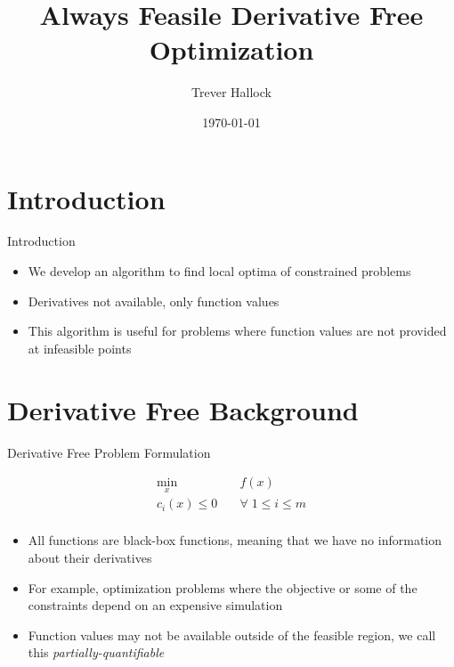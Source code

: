 \documentclass{beamer}
\begin{document}
\title{Always Feasile Derivative Free Optimization}   
\author{Trever Hallock} 
\date{\today} 

\frame{\titlepage} 

\section{Introduction}

\begin{frame}{Introduction}
    \begin{itemize}
        \item We develop an algorithm to find local optima of constrained problems
        \item Derivatives not available, only function values
        \item This algorithm is useful for problems where function values are not provided at infeasible points
    \end{itemize}
\end{frame}

\section{Derivative Free Background}

\begin{frame}{Derivative Free Problem Formulation}
\begin{center}
\label{Problem}
\begin{align*}
\min_x & \quad f(x) \\
  c_i(x) \le 0   & \quad \forall \; 1 \le i \le m \\
\end{align*}
\end{center}
    \begin{itemize}
        \item All functions are black-box functions, meaning that we have no information about their derivatives
        \item For example, optimization problems where the objective or some of the constraints depend on an expensive simulation
        \item Function values may not be available outside of the feasible region, we call this \emph{partially-quantifiable}
    \end{itemize}
\end{frame}
\end{document}
